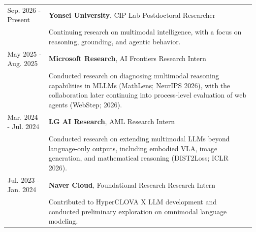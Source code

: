 
\begin{longtable}[l]{@{}p{} p{}}
    Sep. 2026 - Present & \textbf{Yonsei University}, CIP Lab \hfill Postdoctoral Researcher \\
    & Continuing research on multimodal intelligence, with a focus on reasoning, grounding, and agentic behavior. \\
    May 2025 - Aug. 2025 & \textbf{Microsoft Research}, AI Frontiers \hfill Research Intern \\
    & Conducted research on diagnosing multimodal reasoning capabilities in MLLMs (MathLens; NeurIPS 2026), with the collaboration later continuing into process-level evaluation of web agents (WebStep; 2026). \\
    Mar. 2024 - Jul. 2024 & \textbf{LG AI Research}, AML \hfill Research Intern \\
    & Conducted research on extending multimodal LLMs beyond language-only outputs, including embodied VLA, image generation, and mathematical reasoning (DIST2Loss; ICLR 2026). \\
    Jul. 2023 - Jan. 2024 & \textbf{Naver Cloud}, Foundational Research \hfill Research Intern \\
    & Contributed to HyperCLOVA X LLM development and conducted preliminary exploration on omnimodal language modeling. \\
\end{longtable}
